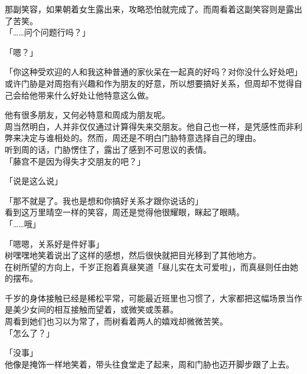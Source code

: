 那副笑容，如果朝着女生露出来，攻略恐怕就完成了。而周看着这副笑容则是露出了苦笑。\\

「……问个问题行吗？」

「嗯？」

「你这种受欢迎的人和我这种普通的家伙呆在一起真的好吗？对你没什么好处吧」\\

或许门胁是对周抱有兴趣和作为朋友的好意，所以想要搞好关系，但周却不觉得自己会给他带来什么好处让他特意这么做。

他有很多朋友，又何必特意和周成为朋友呢。\\

周当然明白，人并非仅仅通过计算得失来交朋友。他自己也一样，是凭感性而非利弊来决定与谁相处的。然而，周还是不明白门胁特意选择自己的理由。\\

听到周的话，门胁愣住了，露出了感到不可思议的表情。\\

「藤宫不是因为得失才交朋友的吧？」

「说是这么说」

「那不就是了。我也是想和你搞好关系才跟你说话的」\\

看到这万里晴空一样的笑容，周还是觉得他很耀眼，眯起了眼睛。\\

「……哦」

「嗯嗯，关系好是件好事」\\

树嘿嘿地笑着说出了这样的感想，然后很快就把目光移到了其他地方。\\

在树所望的方向上，千岁正抱着真昼笑道「昼儿实在太可爱啦」，而真昼则任由她的摆布。

千岁的身体接触已经是稀松平常，可能最近班里也习惯了，大家都把这幅场景当作是美少女间的相互接触而望着，或微笑或羡慕。\\

周看到她们也习以为常了，而树看着两人的嬉戏却微微苦笑。\\

「怎么了？」

「没事」\\

他像是掩饰一样地笑着，带头往食堂走了起来，周和门胁也迈开脚步跟了上去。\\

\vspace{2\baselineskip}


